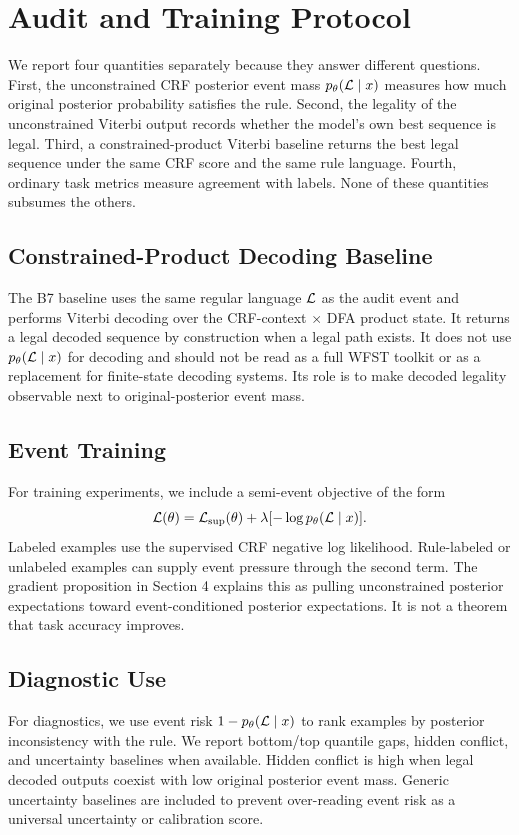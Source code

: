 \section{Audit and Training Protocol}

We report four quantities separately because they answer different questions.
First, the unconstrained CRF posterior event mass \(p_{\theta}(\mathcal{L} \mid x)\)
measures how much original posterior probability satisfies the rule.  Second,
the legality of the unconstrained Viterbi output records whether the model's
own best sequence is legal.  Third, a constrained-product Viterbi baseline
returns the best legal sequence under the same CRF score and the same rule
language.  Fourth, ordinary task metrics measure agreement with labels.  None
of these quantities subsumes the others.

\subsection{Constrained-Product Decoding Baseline}

The B7 baseline uses the same regular language \(\mathcal{L}\) as the audit event and
performs Viterbi decoding over the CRF-context \(\times\) DFA product state.
It returns a legal decoded sequence by construction when a legal path exists.
It does not use \(p_{\theta}(\mathcal{L} \mid x)\) for decoding and should not be read
as a full WFST toolkit or as a replacement for finite-state decoding systems.
Its role is to make decoded legality observable next to original-posterior
event mass.

\subsection{Event Training}

For training experiments, we include a semi-event objective of the form
\[
  \mathcal{L}(\theta)
  = \mathcal{L}_{\mathrm{sup}}(\theta)
    + \lambda[-\log p_{\theta}(\mathcal{L} \mid x)].
\]
Labeled examples use the supervised CRF negative log likelihood.  Rule-labeled
or unlabeled examples can supply event pressure through the second term.  The
gradient proposition in Section 4 explains this as pulling unconstrained
posterior expectations toward event-conditioned posterior expectations.  It is
not a theorem that task accuracy improves.

\subsection{Diagnostic Use}

For diagnostics, we use event risk \(1-p_{\theta}(\mathcal{L}\mid x)\) to rank examples
by posterior inconsistency with the rule.  We report bottom/top quantile gaps,
hidden conflict, and uncertainty baselines when available.  Hidden conflict is
high when legal decoded outputs coexist with low original posterior event mass.
Generic uncertainty baselines are included to prevent over-reading event risk
as a universal uncertainty or calibration score.
